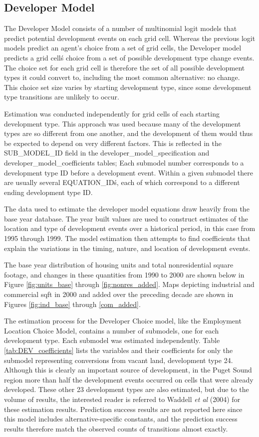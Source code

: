 \subsection{Developer Model}

The Developer Model consists of a number of multinomial logit
models that predict potential development events on each grid
cell. Whereas the previous logit models predict an agent's choice
from a set of grid cells, the Developer model predicts a grid
cell\'s choice from a set of possible development type change
events.  The choice set for each grid cell is therefore the set of
all possible development types it could convert to, including the
most common alternative: no change. This choice set size varies by
starting development type, since some development type transitions
are unlikely to occur.

Estimation was conducted independently for grid cells of each
starting development type.  This approach was used because many of
the development types are so different from one another, and the
development of them would thus be expected to depend on very
different factors. This is reflected in the SUB\_MODEL\_ID field
in the developer\_model\_specification and
developer\_model\_coefficients tables; Each submodel number
corresponds to a development type ID before a development event.
Within a given submodel there are usually several EQUATION\_ID\'s,
each of which correspond to a different ending development type
ID.

The data used to estimate the developer model equations draw
heavily from the base year database.  The year built values are
used to construct estimates of the location and type of
development events over a historical period, in this case from
1995 through 1999.  The model estimation then attempts to find
coefficients that explain the variations in the timing, nature,
and location of development events.

The base year distribution of housing units and total
nonresidential square footage, and changes in these quantities
from 1990 to 2000 are shown below in Figure \ref{fig:units_base}
through \ref{fig:nonres_added}.  Maps depicting industrial and
commercial sqft in 2000 and added over the preceding decade are
shown in Figures \ref{fig:ind_base} through \ref{com_added}.

The estimation process for the Developer Choice model, like the
Employment Location Choice Model, contains a number of submodels,
one for each development type. Each submodel was estimated
independently. Table \ref{tab:DEV_coefficients} lists the
variables and their coefficients for only the submodel
representing conversions from vacant land, development type 24.
Although this is clearly an important source of development, in
the Puget Sound region more than half the development events
occurred on cells that were already developed.  These other 23
development types are also estimated, but due to the volume of
results, the interested reader is referred to Waddell \emph{et al}
(2004) for these estimation results.  Prediction success results
are not reported here since this model includes
alternative-specific constants, and the prediction success results
therefore match the observed counts of transitions almost exactly.

